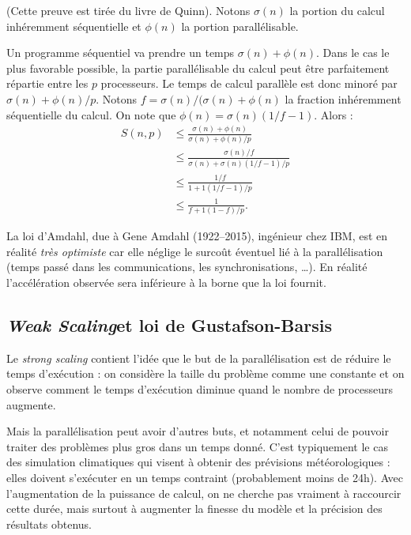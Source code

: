 \begin{myproof}
  (Cette preuve est tirée du livre de Quinn). Notons $\sigma(n)$ la portion du
  calcul inhéremment séquentielle et $\phi(n)$ la portion parallélisable.

  Un programme séquentiel va prendre un temps $\sigma(n) + \phi(n)$. Dans le cas
  le plus favorable possible, la partie parallélisable du calcul peut être
  parfaitement répartie entre les $p$ processeurs. Le temps de calcul parallèle
  est donc minoré par $\sigma(n) + \phi(n) / p$. Notons
  $f = \sigma(n) / (\sigma(n) + \phi(n)$ la fraction inhéremment séquentielle du
  calcul. On note que $\phi(n) = \sigma(n)(1/f - 1)$. Alors :
  \begin{align*}
    S(n, p) &\leq \frac{\sigma(n) + \phi(n)}{\sigma(n) + \phi(n) / p} \\
            &\leq \frac{\sigma(n) / f}{\sigma(n) + \sigma(n)(1/f - 1) / p} \\
            &\leq \frac{1 / f}{1 + 1(1/f - 1) / p} \\
            &\leq \frac{1}{f + 1(1 - f) / p}.
  \end{align*}
\end{myproof}

La loi d'Amdahl, due à Gene Amdahl (1922--2015), ingénieur chez IBM, est en
réalité \emph{très optimiste} car elle néglige le surcoût éventuel lié à la
parallélisation (temps passé dans les communications, les synchronisations,
\dots). En réalité l'accélération observée sera inférieure à la borne que la loi
fournit.

\subsection{\og \textit{Weak Scaling}\fg et loi de Gustafson-Barsis}

Le \textit{strong scaling} contient l'idée que le but de la parallélisation est
de réduire le temps d'exécution : on considère la taille du problème comme une
constante et on observe comment le temps d'exécution diminue quand le nombre de
processeurs augmente.

Mais la parallélisation peut avoir d'autres buts, et notamment celui de pouvoir
traiter des problèmes plus gros dans un temps donné. C'est typiquement le cas
des simulation climatiques qui visent à obtenir des prévisions météorologiques :
elles doivent s'exécuter en un temps contraint (probablement moins de 24h). Avec
l'augmentation de la puissance de calcul, on ne cherche pas vraiment à
raccourcir cette durée, mais surtout à augmenter la finesse du modèle et la
précision des résultats obtenus.

